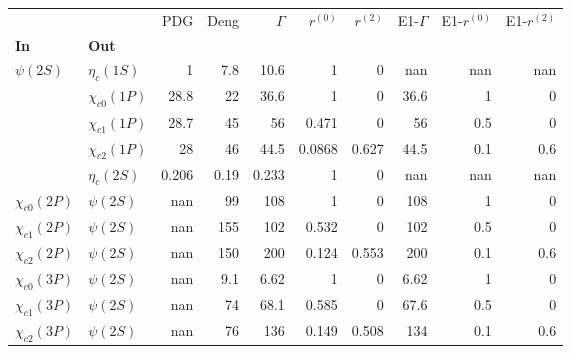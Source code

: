 \begin{tabular}{l|l|r|r|r|r|r|r|r|r}
\toprule
                &            &   PDG &  Deng &  $\Gamma$ &  $r^{(0)}$ &  $r^{(2)}$ &  E1-$\Gamma$ &  E1-$r^{(0)}$ &  E1-$r^{(2)}$ \\
\textbf{In} & \textbf{Out} &       &       &           &            &            &              &               &               \\
\midrule
\textbf{$\psi(2S)$} & \textbf{$\eta_{c}(1S)$} &     1 &   7.8 &      10.6 &          1 &          0 &          nan &           nan &           nan \\
                & \textbf{$\chi_{c0}(1P)$} &  28.8 &    22 &      36.6 &          1 &          0 &         36.6 &             1 &             0 \\
                & \textbf{$\chi_{c1}(1P)$} &  28.7 &    45 &        56 &      0.471 &          0 &           56 &           0.5 &             0 \\
                & \textbf{$\chi_{c2}(1P)$} &    28 &    46 &      44.5 &     0.0868 &      0.627 &         44.5 &           0.1 &           0.6 \\
                & \textbf{$\eta_{c}(2S)$} & 0.206 &  0.19 &     0.233 &          1 &          0 &          nan &           nan &           nan \\
\textbf{$\chi_{c0}(2P)$} & \textbf{$\psi(2S)$} &   nan &    99 &       108 &          1 &          0 &          108 &             1 &             0 \\
\textbf{$\chi_{c1}(2P)$} & \textbf{$\psi(2S)$} &   nan &   155 &       102 &      0.532 &          0 &          102 &           0.5 &             0 \\
\textbf{$\chi_{c2}(2P)$} & \textbf{$\psi(2S)$} &   nan &   150 &       200 &      0.124 &      0.553 &          200 &           0.1 &           0.6 \\
\textbf{$\chi_{c0}(3P)$} & \textbf{$\psi(2S)$} &   nan &   9.1 &      6.62 &          1 &          0 &         6.62 &             1 &             0 \\
\textbf{$\chi_{c1}(3P)$} & \textbf{$\psi(2S)$} &   nan &    74 &      68.1 &      0.585 &          0 &         67.6 &           0.5 &             0 \\
\textbf{$\chi_{c2}(3P)$} & \textbf{$\psi(2S)$} &   nan &    76 &       136 &      0.149 &      0.508 &          134 &           0.1 &           0.6 \\
\bottomrule
\end{tabular}
